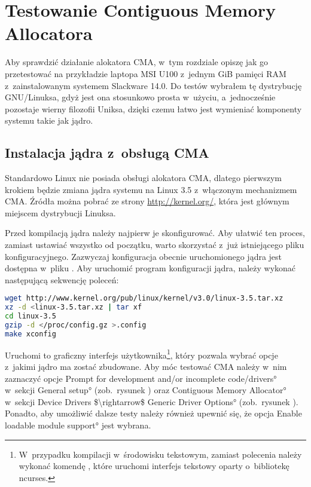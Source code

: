 \chapter{Testowanie Contiguous Memory Allocatora}

Aby sprawdzić działanie alokatora CMA, w~tym rozdziale opiszę jak go
przetestować na przykładzie laptopa MSI U100 z~jednym GiB pamięci RAM
z~zainstalowanym systemem Slackware 14.0.  Do testów wybrałem tę
dystrybucję GNU/Linuksa, gdyż jest ona stosunkowo prosta w~użyciu,
a~jednocześnie pozostaje wierny filozofii Uniksa, dzięki czemu łatwo
jest wymieniać komponenty systemu takie jak jądro.


\section{Instalacja jądra z~obsługą CMA}

Standardowo Linux nie posiada obsługi alokatora CMA, dlatego pierwszym
krokiem będzie zmiana jądra systemu na Linux 3.5 z~włączonym
mechanizmem CMA.  Źródła można pobrać ze strony
\url{http://kernel.org/}, która jest głównym miejscem dystrybucji
Linuksa.

Przed kompilacją jądra należy najpierw je skonfigurować.  Aby ułatwić
ten proces, zamiast ustawiać wszystko od początku, warto skorzystać
z~już istniejącego pliku konfiguracyjnego.  Zazwyczaj konfiguracja
obecnie uruchomionego jądra jest dostępna w~pliku
.  Aby uruchomić program konfiguracji jądra,
należy wykonać następującą sekwencję poleceń:

\begin{lstlisting}[language=sh,numbers=none]
wget http://www.kernel.org/pub/linux/kernel/v3.0/linux-3.5.tar.xz
xz -d <linux-3.5.tar.xz | tar xf
cd linux-3.5
gzip -d </proc/config.gz >.config
make xconfig
\end{lstlisting}

Uruchomi to graficzny interfejs użytkownika\footnote{W~przypadku
  kompilacji w~środowisku tekstowym, zamiast polecenia  należy wykonać komendę , które
  uruchomi interfejs tekstowy oparty o~bibliotekę ncurses.}, który
pozwala wybrać opcje z~jakimi jądro ma zostać zbudowane.  Aby móc
testować CMA należy w~nim zaznaczyć opcje \ang*{Prompt for development
  and/or incomplete code/drivers} w~sekcji \ang*{General setup}
(zob.\ rysunek ) oraz \ang*{Contiguous Memory
  Allocator} w~sekcji \ang*{Device Drivers $\rightarrow$ Generic
  Driver Options} (zob.\ rysunek ).  Ponadto,
aby umożliwić dalsze testy należy również upewnić się, że opcja
\ang*{Enable loadable module support} jest wybrana.

